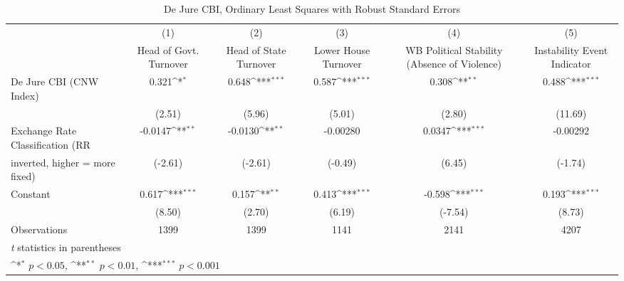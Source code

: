 \begin{table}[htbp]\centering
\def\sym#1{\ifmmode^{#1}\else\(^{#1}\)\fi}
\caption{De Jure CBI, Ordinary Least Squares with Robust Standard Errors \label{multIndOLSDJ}}
\begin{tabular}{l*{5}{c}}
\toprule
                                        &\multicolumn{1}{c}{(1)}&\multicolumn{1}{c}{(2)}&\multicolumn{1}{c}{(3)}&\multicolumn{1}{c}{(4)}&\multicolumn{1}{c}{(5)}\\
                                        &\multicolumn{1}{c}{Head of Govt. Turnover}&\multicolumn{1}{c}{Head of State Turnover}&\multicolumn{1}{c}{Lower House Turnover}&\multicolumn{1}{c}{WB Political Stability (Absence of Violence)}&\multicolumn{1}{c}{Instability Event Indicator}\\
\midrule
De Jure CBI (CNW Index)                 &0.321\sym{*}  &0.648\sym{***}&0.587\sym{***}&0.308\sym{**} &0.488\sym{***}\\
                                        &(2.51)         &(5.96)         &(5.01)         &(2.80)         &(11.69)         \\
\addlinespace
Exchange Rate Classification (RR        &-0.0147\sym{**} &-0.0130\sym{**} &-0.00280         &0.0347\sym{***}&-0.00292         \\
inverted, higher = more fixed)          &(-2.61)         &(-2.61)         &(-0.49)         &(6.45)         &(-1.74)         \\
\addlinespace
Constant                                &0.617\sym{***}&0.157\sym{**} &0.413\sym{***}&-0.598\sym{***}&0.193\sym{***}\\
                                        &(8.50)         &(2.70)         &(6.19)         &(-7.54)         &(8.73)         \\
\midrule
Observations                            & 1399         & 1399         & 1141         & 2141         & 4207         \\
\bottomrule
\multicolumn{6}{l}{\footnotesize \textit{t} statistics in parentheses}\\
\multicolumn{6}{l}{\footnotesize \sym{*} \(p<0.05\), \sym{**} \(p<0.01\), \sym{***} \(p<0.001\)}\\
\end{tabular}
\end{table}
